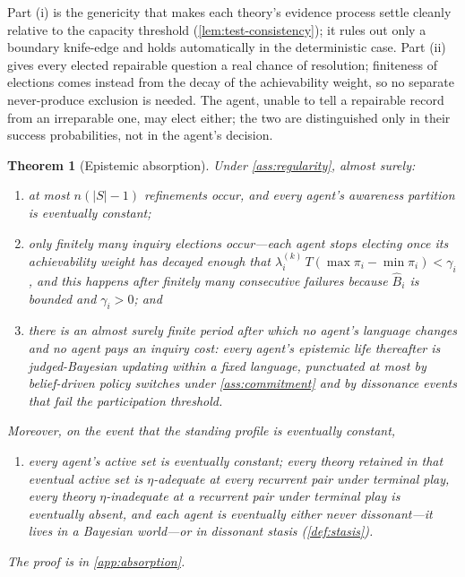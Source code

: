 \documentclass[11pt]{article}
\newtheorem{theorem}[assumption]{Theorem}
\theoremstyle{definition}
\begin{document}
Part (i) is the genericity that makes each theory's evidence process settle cleanly relative to the capacity threshold (\cref{lem:test-consistency}); it rules out only a boundary knife-edge and holds automatically in the deterministic case.
Part (ii) gives every elected repairable question a real chance of resolution; finiteness of elections comes instead from the decay of the achievability weight, so no separate never-produce exclusion is needed.
The agent, unable to tell a repairable record from an irreparable one, may elect either; the two are distinguished only in their success probabilities, not in the agent's decision.

\begin{theorem}[Epistemic absorption]
\label{thm:absorption}
Under \cref{ass:regularity}, almost surely:
\begin{enumerate}[label=(\alph*)]
  \item at most $n(|S|-1)$ refinements occur, and every agent's awareness partition is eventually constant;
  \item only finitely many inquiry elections occur---each agent stops electing once its achievability weight has decayed enough that $\lambda_i^{(k)}\,T(\max \pi_i-\min \pi_i)<\gamma_i$, and this happens after finitely many consecutive failures because $\widehat B_i$ is bounded and $\gamma_i>0$; and
  \item there is an almost surely finite period after which no agent's language changes and no agent pays an inquiry cost: every agent's epistemic life thereafter is judged-Bayesian updating within a fixed language, punctuated at most by belief-driven policy switches under \cref{ass:commitment} and by dissonance events that fail the participation threshold.
\end{enumerate}
Moreover, on the event that the standing profile is eventually constant,
\begin{enumerate}[label=(\alph*),start=4]
  \item every agent's active set is eventually constant; every theory retained in that eventual active set is $\eta$-adequate at every recurrent pair under terminal play, every theory $\eta$-inadequate at a recurrent pair under terminal play is eventually absent, and each agent is eventually either never dissonant---it lives in a Bayesian world---or in dissonant stasis (\cref{def:stasis}).
\end{enumerate}
The proof is in \cref{app:absorption}.
\end{theorem}
\end{document}
